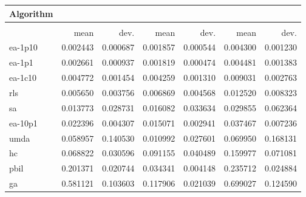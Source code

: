 \begin{tabular}{@{} l *{6}{>{{}}N{1}{2}} @{}}
\toprule
{Algorithm} &  \\
\midrule
&  &  &  \\
\midrule
& {mean} & {dev.} & {mean} & {dev.} & {mean} & {dev.} \\
\midrule
ea-1p10 & 0.002443 & 0.000687 & 0.001857 & 0.000544 & 0.004300 & 0.001230 \\
ea-1p1 & 0.002661 & 0.000937 & 0.001819 & 0.000474 & 0.004481 & 0.001383 \\
ea-1c10 & 0.004772 & 0.001454 & 0.004259 & 0.001310 & 0.009031 & 0.002763 \\
rls & 0.005650 & 0.003756 & 0.006869 & 0.004568 & 0.012520 & 0.008323 \\
sa & 0.013773 & 0.028731 & 0.016082 & 0.033634 & 0.029855 & 0.062364 \\
ea-10p1 & 0.022396 & 0.004307 & 0.015071 & 0.002941 & 0.037467 & 0.007236 \\
umda & 0.058957 & 0.140530 & 0.010992 & 0.027601 & 0.069950 & 0.168131 \\
hc & 0.068822 & 0.030596 & 0.091155 & 0.040489 & 0.159977 & 0.071081 \\
pbil & 0.201371 & 0.020744 & 0.034341 & 0.004148 & 0.235712 & 0.024884 \\
ga & 0.581121 & 0.103603 & 0.117906 & 0.021039 & 0.699027 & 0.124590 \\
\bottomrule
\end{tabular}
